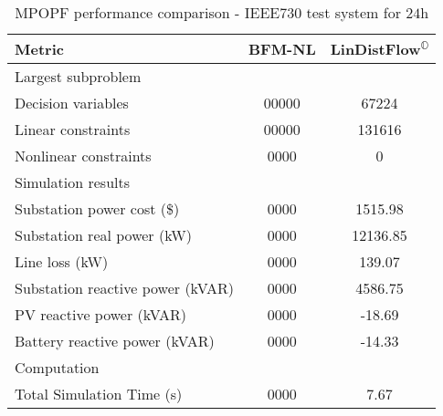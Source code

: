 \documentclass[../../outputs/main.tex]{subfiles}
\begin{document}
\begin{table}[t] %
    \centering
    \caption{MPOPF performance comparison - IEEE730 test system for $24$h}
    \begin{tabular}{|l|c|c|}
    \hline
    \textbf{Metric} & \textbf{BFM-NL} & \textbf{LinDistFlow\textsuperscript{\(\mathbb{O}\)}} \\ \hline
    Largest subproblem & \multicolumn{2}{c|}{} \\ \hline
    \quad Decision variables & {00000} & {67224} \\ \hline
    \quad Linear constraints & {00000} & {131616} \\ \hline
    \quad Nonlinear constraints & {0000} & {0} \\ \hline
    Simulation results  & \multicolumn{2}{c|}{} \\ \hline
    \quad Substation power cost (\$) & 0000 & 1515.98 \\ \hline
    \quad Substation real power (kW) & 0000 & 12136.85 \\ \hline
    \quad Line loss (kW) & 0000 & 139.07 \\ \hline
    \quad Substation reactive power (kVAR) & 0000 & 4586.75 \\ \hline
    \quad PV reactive power (kVAR) & 0000 & -18.69 \\ \hline
    \quad Battery reactive power (kVAR) & 0000 & -14.33 \\ \hline
    Computation  & \multicolumn{2}{c|}{} \\ \hline
    \quad Total Simulation Time (s) & 0000 & 7.67 \\ \hline
    \end{tabular}
    \label{table:opt-ieee730-24h}
    \vspace{-3mm}
\end{table}

\end{document}
